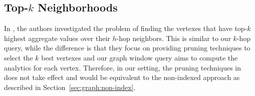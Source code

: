 \subsection{Top-$k$ Neighborhoods}
In \cite{yan2010top}, the authors investigated the problem of finding the vertexes
that have top-$k$ highest aggregate values over their $h$-hop neighbors.
This is similar to our $k$-hop query, while the difference is that they
focus on providing pruning techniques to select the $k$ best vertexes and our graph
window query aims to compute the analytics for each vertex. Therefore,
in our setting, the pruning techniques in~\cite{yan2010top} does not take effect
and would be equivalent to the non-indexed approach as described in Section~\ref{sec:graph:non-index}.

%

